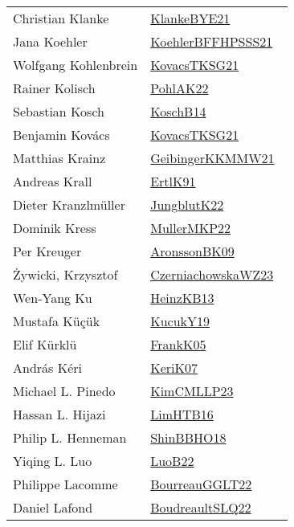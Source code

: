 {\begin{longtable}{p{4cm}p{20cm}}
Christian Klanke & \href{works/KlankeBYE21.pdf}{KlankeBYE21}~\cite{KlankeBYE21}\\
Jana Koehler & \href{works/KoehlerBFFHPSSS21.pdf}{KoehlerBFFHPSSS21}~\cite{KoehlerBFFHPSSS21}\\
Wolfgang Kohlenbrein & \href{works/KovacsTKSG21.pdf}{KovacsTKSG21}~\cite{KovacsTKSG21}\\
Rainer Kolisch & \href{works/PohlAK22.pdf}{PohlAK22}~\cite{PohlAK22}\\
Sebastian Kosch & \href{works/KoschB14.pdf}{KoschB14}~\cite{KoschB14}\\
Benjamin Kov{\'{a}}cs & \href{works/KovacsTKSG21.pdf}{KovacsTKSG21}~\cite{KovacsTKSG21}\\
Matthias Krainz & \href{works/GeibingerKKMMW21.pdf}{GeibingerKKMMW21}~\cite{GeibingerKKMMW21}\\
Andreas Krall & \href{works/ErtlK91.pdf}{ErtlK91}~\cite{ErtlK91}\\
Dieter Kranzlm{\"{u}}ller & \href{}{JungblutK22}~\cite{JungblutK22}\\
Dominik Kress & \href{works/MullerMKP22.pdf}{MullerMKP22}~\cite{MullerMKP22}\\
Per Kreuger & \href{works/AronssonBK09.pdf}{AronssonBK09}~\cite{AronssonBK09}\\
Żywicki, Krzysztof & \href{works/CzerniachowskaWZ23.pdf}{CzerniachowskaWZ23}~\cite{CzerniachowskaWZ23}\\
Wen{-}Yang Ku & \href{works/HeinzKB13.pdf}{HeinzKB13}~\cite{HeinzKB13}\\
Mustafa K{\"u}ç{\"u}k & \href{}{KucukY19}~\cite{KucukY19}\\
Elif K{\"{u}}rkl{\"{u}} & \href{works/FrankK05.pdf}{FrankK05}~\cite{FrankK05}\\
Andr{\'{a}}s K{\'{e}}ri & \href{works/KeriK07.pdf}{KeriK07}~\cite{KeriK07}\\
Michael L. Pinedo & \href{works/KimCMLLP23.pdf}{KimCMLLP23}~\cite{KimCMLLP23}\\
Hassan L. Hijazi & \href{works/LimHTB16.pdf}{LimHTB16}~\cite{LimHTB16}\\
Philip L. Henneman & \href{works/ShinBBHO18.pdf}{ShinBBHO18}~\cite{ShinBBHO18}\\
Yiqing L. Luo & \href{works/LuoB22.pdf}{LuoB22}~\cite{LuoB22}\\
Philippe Lacomme & \href{works/BourreauGGLT22.pdf}{BourreauGGLT22}~\cite{BourreauGGLT22}\\
Daniel Lafond & \href{works/BoudreaultSLQ22.pdf}{BoudreaultSLQ22}~\cite{BoudreaultSLQ22}\\

\end{longtable}}
